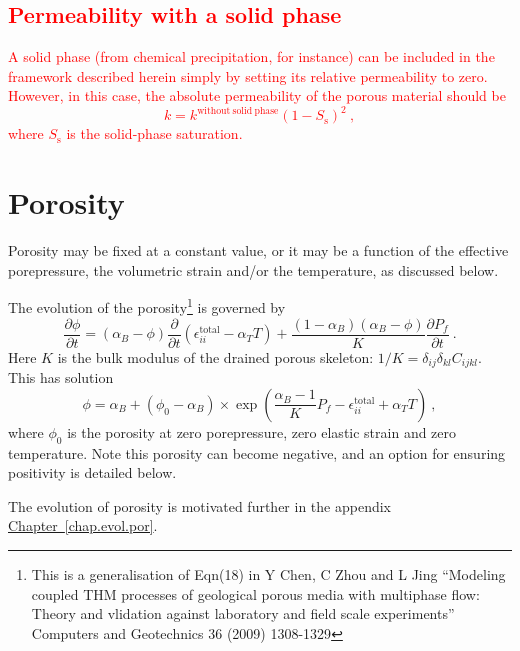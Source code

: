 \documentclass[12pt]{report}
\begin{document}
\subsection{\textcolor{red}{Permeability with a solid phase}}

\textcolor{red}{
A solid phase (from chemical precipitation, for instance) can be
included in the framework described herein simply by setting its
relative permeability to zero.  However, in this case, the absolute
permeability of the porous material should be
\begin{equation}
k = k^{\mathrm{without\ solid\ phase}}(1 - S_{\mathrm{s}})^{2} \ ,
\end{equation}
where $S_{\mathrm{s}}$ is the solid-phase saturation.
}

\section{Porosity}
\label{por.sec}

Porosity may be fixed at a constant value, or it may be a function of
the effective porepressure, the volumetric strain and/or the
temperature, as discussed below.

The evolution of the porosity\footnote{This is a generalisation of
  Eqn(18) in Y Chen, C Zhou and L Jing ``Modeling coupled THM
  processes of geological porous media with multiphase flow: Theory
  and vlidation against laboratory and field scale experiments''
  Computers and Geotechnics 36 (2009) 1308-1329} is governed by
\begin{equation}
\frac{\partial \phi}{\partial t} = (\alpha_{B} -
\phi)\frac{\partial}{\partial t}
\left(\epsilon^{\mathrm{total}}_{ii} - \alpha_{T} T\right) +
\frac{(1-\alpha_{B})(\alpha_{B}-\phi)}{K}\frac{\partial
  P_{f}}{\partial t} \ .
\label{eqn.phi.dog}
\end{equation}
Here $K$ is the bulk modulus of the drained porous skeleton: $1/K
= \delta_{ij}\delta_{kl}C_{ijkl}$.  This has solution
\begin{equation}
\phi = \alpha_{B} + (\phi_{0} - \alpha_{B})\times \exp \left( \frac{\alpha_{B}
  - 1}{K}P_{f} - \epsilon^{\mathrm{total}}_{ii} + \alpha_{T}T \right) \ ,
\label{poro.evolve.eqn}
\end{equation}
where $\phi_{0}$ is the porosity at zero porepressure, zero elastic
strain and zero temperature. Note this porosity can become negative,
and an option for ensuring positivity is detailed below.

The evolution of porosity is motivated further in the appendix
\hyperref[chap.evol.por]{Chapter~\ref*{chap.evol.por}}.
\end{document}
